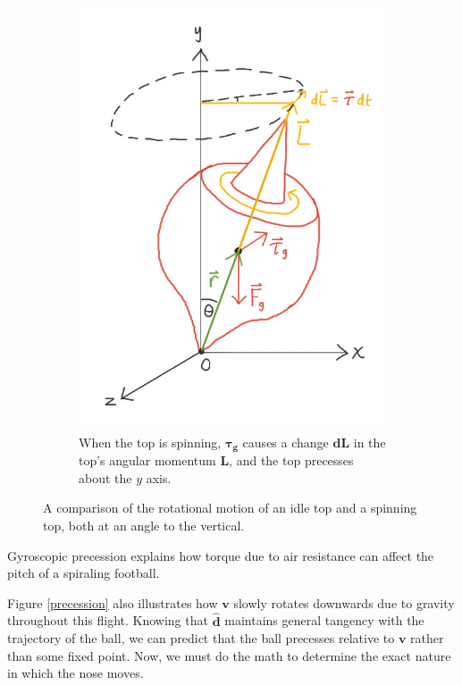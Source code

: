 \documentclass{article}
\begin{document}
\begin{figure}[h]
\begin{subfigure}[t]{0.4\textwidth}
         \includegraphics[width=\textwidth]{img/top (2).png}
         \caption{When the top is spinning, $\pmb{\tau_g}$ causes a change $\mathbf{dL}$ in the top's angular momentum $\mathbf{L}$, and the top precesses about the $y$ axis.}
         \label{top2}
     \end{subfigure}
     \hspace*{\fill}
    \caption{A comparison of the rotational motion of an idle top and a spinning top, both at an angle to the vertical.}
\end{figure}

Gyroscopic precession explains how torque due to air resistance can affect the pitch of a spiraling football.

Figure \ref{precession} also illustrates how $\mathbf{v}$ slowly rotates downwards due to gravity throughout this flight. Knowing that $\mathbf{\hat{d}}$ maintains general tangency with the trajectory of the ball, we can predict that the ball precesses relative to $\mathbf{v}$ rather than some fixed point. Now, we must do the math to determine the exact nature in which the nose moves.
\end{document}
